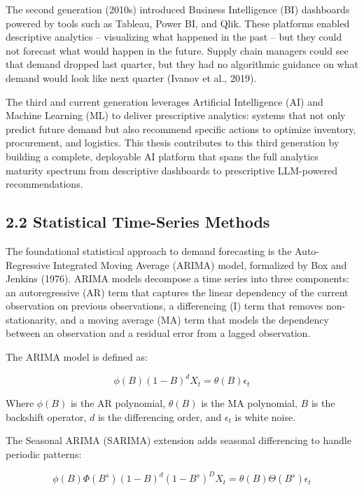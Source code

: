 \documentclass[12pt, a4paper]{report}
\begin{document}
The second generation (2010s) introduced Business Intelligence (BI) dashboards powered by tools such as Tableau, Power BI, and Qlik. These platforms enabled descriptive analytics -- visualizing what happened in the past -- but they could not forecast what would happen in the future. Supply chain managers could see that demand dropped last quarter, but they had no algorithmic guidance on what demand would look like next quarter (Ivanov et al., 2019).

The third and current generation leverages Artificial Intelligence (AI) and Machine Learning (ML) to deliver prescriptive analytics: systems that not only predict future demand but also recommend specific actions to optimize inventory, procurement, and logistics. This thesis contributes to this third generation by building a complete, deployable AI platform that spans the full analytics maturity spectrum from descriptive dashboards to prescriptive LLM-powered recommendations.

\subsection{2.2 Statistical Time-Series Methods}

The foundational statistical approach to demand forecasting is the Auto-Regressive Integrated Moving Average (ARIMA) model, formalized by Box and Jenkins (1976). ARIMA models decompose a time series into three components: an autoregressive (AR) term that captures the linear dependency of the current observation on previous observations, a differencing (I) term that removes non-stationarity, and a moving average (MA) term that models the dependency between an observation and a residual error from a lagged observation.

The ARIMA model is defined as:

\begin{equation}
\phi(B)(1-B)^d X_t = \theta(B)\epsilon_t
\end{equation}

Where $\phi(B)$ is the AR polynomial, $\theta(B)$ is the MA polynomial, $B$ is the backshift operator, $d$ is the differencing order, and $\epsilon_t$ is white noise.

The Seasonal ARIMA (SARIMA) extension adds seasonal differencing to handle periodic patterns:

\begin{equation}
\phi(B)\Phi(B^s)(1-B)^d(1-B^s)^D X_t = \theta(B)\Theta(B^s)\epsilon_t
\end{equation}
\end{document}
